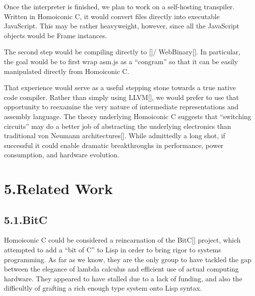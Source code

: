 \documentclass[preprint]{{acmart}}
\begin{document}
\noindent{}Once the interpreter is finished, we plan to work on a self-hosting
transpiler. Written in Homoiconic C, it would convert  files
directly into executable JavaScript. This may be rather heavyweight,
however, since all the JavaScript objects would be Frame
instances.%

The second step would be compiling directly to []/
WebBinary[]. In particular, the goal would be to first wrap asm.js
as a \textquotedblleft{}congram\textquotedblright{} so that it can be easily manipulated directly from Homoiconic C.%

That experience would serve as a useful stepping stone towards a true
native code compiler. Rather than simply using LLVM[], we would
prefer to use that opportunity to reexamine the very nature of
intermediate representations and assembly language. The theory underlying
Homoiconic C suggests that \textquotedblleft{}switching circuits\textquotedblright{} may do a better job of
abstracting the underlying electronics than traditional von Neumann
architectures[]. While admittedly a long shot, if successful it
could enable dramatic breakthroughs in performance, power consumption,
and hardware evolution.%

\section{5.\hspace*{0.5em}Related Work}\label{sec-related-work}%

\subsection{5.1.\hspace*{0.5em}BitC}\label{sec-bitc}%

\noindent{}Homoiconic C could be considered a reincarnation of the BitC[]
project, which attempted to add a \textquotedblleft{}bit of C\textquotedblright{} to Lisp in order to bring
rigor to systems programming. As far as we know, they are the only group
to have tackled the gap between the elegance of lambda calculus and
efficient use of actual computing hardware. They appeared to have stalled
due to a lack of funding, and also the difficultly of grafting a rich
enough type system onto Lisp syntax.%
\end{document}
